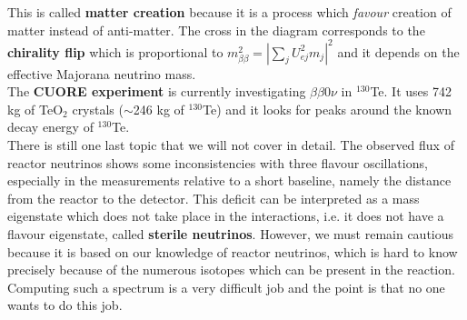 \documentclass[10.75pt,a4paper,openright,bottom=2cm]{article}
\begin{document}
\begin{center}
\end{center}
This is called \textbf{matter creation} because it is a process which \textit{favour} creation of matter instead of anti-matter. The cross in the diagram corresponds to the \textbf{chirality flip} which is proportional to $m^2_{\beta\beta}=|\sum_jU_{ej}^2m_j|^2$ and it depends on the effective Majorana neutrino mass.\\
The \textbf{CUORE experiment} is currently investigating $\beta\beta0\nu$ in $^{130}$Te. It uses 742 kg of TeO$_2$ crystals ($\sim$246 kg of $^{130}$Te) and it looks for peaks around the known decay energy of $^{130}$Te.\\
There is still one last topic that we will not cover in detail. The observed flux of reactor neutrinos shows some inconsistencies with three flavour oscillations, especially in the measurements relative to a short baseline, namely the distance from the reactor to the detector. This deficit can be interpreted as a  mass eigenstate which does not take place in the interactions, i.e. it does not have a flavour eigenstate, called \textbf{sterile neutrinos}. However, we must remain cautious because it is based on our knowledge of reactor neutrinos, which is hard to know precisely because of the numerous isotopes which can be present in the reaction. Computing such a spectrum is a very difficult job and the point is that no one wants to do this job.\\
\end{document}
